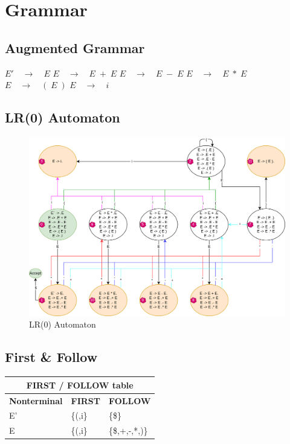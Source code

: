 \break

\section{Grammar}
\subsection{Augmented Grammar}
\begin{algorithmic}[1]
	\setcounter{ALG@line}{-1}	
	\State $E' \quad \rightarrow \quad E$
	\State $E \quad \rightarrow \quad E \; + \; E$
	\State $E \quad \rightarrow \quad E \; - \; E$
	\State $E \quad \rightarrow \quad E \; * \; E$
	\State $E \quad \rightarrow \quad ( \; E \; )$
	\State $E \quad \rightarrow \quad i$
\end{algorithmic}

\break
\subsection{LR(0) Automaton}
\begin{figure}[!h]
	\centering
	\includegraphics[width=\textwidth]{../EXP7/automaton.png}
	\caption{LR(0) Automaton}
\end{figure}

\subsection{First \& Follow}
\begin{table}[!h]
	\centering
	\begin{tabular}{|lll|}
		\hline
		\multicolumn{3}{|c|}{\textbf{FIRST / FOLLOW table}}                      \\ \hline
		\multicolumn{1}{|c|}{\textbf{Nonterminal}} & \multicolumn{1}{c|}{\textbf{FIRST}} & \multicolumn{1}{c|}{\textbf{FOLLOW}} \\ \hline
		\multicolumn{1}{|l|}{E'} & \multicolumn{1}{l|}{\{(,i\}} & \{\$\}         \\ \hline
		\multicolumn{1}{|l|}{E}  & \multicolumn{1}{l|}{\{(,i\}} & \{\$,+,-,*,)\} \\ \hline
	\end{tabular}
\end{table}

